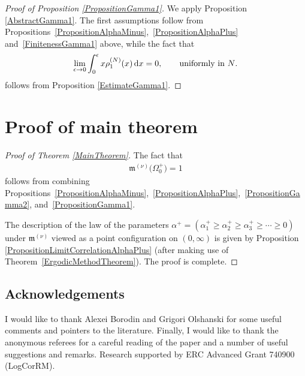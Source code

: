 \documentclass[pdftex]{sigma}
\numberwithin{equation}{section}
\begin{document}
\begin{proof}[Proof of Proposition \ref{PropositionGamma1}] We apply Proposition \ref{AbstractGamma1}. The first assumptions follow from Pro\-po\-si\-tions~\ref{PropositionAlphaMinus},~\ref{PropositionAlphaPlus} and~\ref{FinitenessGamma1} above, while the fact that
\begin{gather*}
\lim_{\epsilon \to 0} \int_{0}^{\epsilon}x \rho_1^{(N)}(x)\,{\rm d}x=0, \qquad \text{uniformly in $N$}.
\end{gather*}
follows from Proposition \ref{EstimateGamma1}.
\end{proof}
\section{Proof of main theorem}\label{section8}

\begin{proof}[Proof of Theorem \ref{MainTheorem}]
The fact that
\begin{gather*}
\mathfrak{m}^{(\nu)}\big(\Omega_0^+\big)=1
\end{gather*}
follows from combining Propositions~\ref{PropositionAlphaMinus},~\ref{PropositionAlphaPlus},~\ref{PropositionGamma2}, and~\ref{PropositionGamma1}.

The description of the law of the parameters $\alpha^+=\left(\alpha^+_1\ge \alpha_2^+\ge\alpha_3^+\ge \cdots \ge 0\right)$ under $\mathfrak{m}^{(\nu)}$ viewed as a point configuration on $(0,\infty)$ is given by Proposition \ref{PropositionLimitCorrelationAlphaPlus} (after making use of Theorem~\ref{ErgodicMethodTheorem}). The proof is complete.
\end{proof}

\subsection*{Acknowledgements}
I would like to thank Alexei Borodin and Grigori Olshanski for some useful comments and pointers to the literature. Finally, I would like to thank the anonymous referees for a careful reading of the paper and a number of useful suggestions and remarks. Research supported by ERC Advanced Grant 740900 (LogCorRM).
\end{document}
